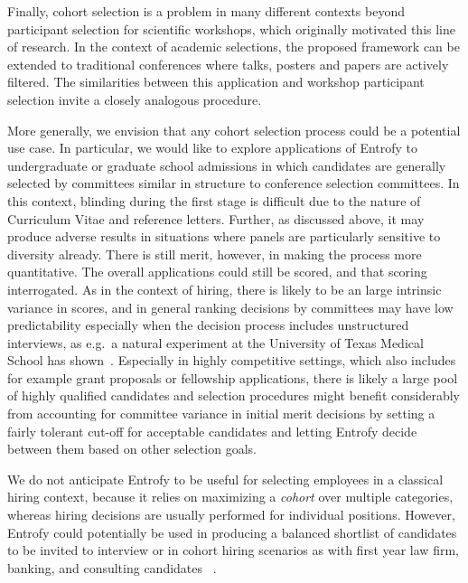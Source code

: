 \documentclass[10pt,letterpaper]{article}
\begin{document}
Finally, cohort selection is a problem in many different contexts beyond participant selection for scientific workshops, which originally motivated this line of research.
In the context of academic selections, the proposed framework can be extended to traditional conferences where talks, posters and papers are actively filtered.
The similarities between this application and workshop participant selection invite a closely analogous procedure.

More generally, we envision that any cohort selection process could be a potential use case.
In particular, we would like to explore applications of Entrofy to undergraduate or graduate school admissions in which candidates are generally selected by committees similar in structure to conference selection committees.
In this context, blinding during the first stage is difficult due to the nature of Curriculum Vitae and reference letters. Further, as discussed above, it may produce adverse results in situations where panels are particularly sensitive to diversity already.
There is still merit, however, in making the process more quantitative.
The overall applications could still be scored, and that scoring interrogated.
As in the context of hiring, there is likely to be an large intrinsic variance in scores, and in general ranking decisions by committees may have low predictability especially when the decision process includes unstructured interviews, as e.g.\ a natural experiment at the University of Texas Medical School has shown~\cite{devaul1987medical}.
Especially in highly competitive settings, which also includes for example grant proposals or fellowship applications, there is likely a large pool of highly qualified candidates and selection procedures might benefit considerably from accounting for committee variance in initial merit decisions by setting a fairly tolerant cut-off for acceptable candidates and letting Entrofy decide between them based on other selection goals.

We do not anticipate Entrofy to be useful for selecting employees in a classical hiring context, because it relies on maximizing a \textit{cohort} over multiple categories, whereas hiring decisions are usually performed for individual positions.
However, Entrofy could potentially be used in producing a balanced shortlist of candidates to be invited to interview or in cohort hiring scenarios as with first year law firm, banking, and consulting candidates ~\cite{rivera2015}.
\end{document}
